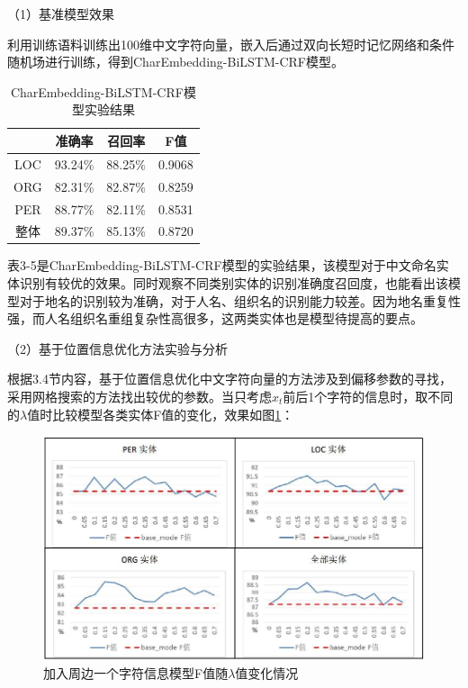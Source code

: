 \documentclass[winfonts,master,oneside,nobackinfo]{njuthesis}
\begin{document}
（1）基准模型效果

利用训练语料训练出100维中文字符向量，嵌入后通过双向长短时记忆网络和条件随机场进行训练，得到CharEmbedding-BiLSTM-CRF模型。

\begin{table}[H]
\centering
\begin{tabular}{|c|c|c|c|}
\hline
    & 准确率     & 召回率     & F值    \\ \hline
LOC & 93.24\% & 88.25\% & 0.9068 \\ \hline
ORG & 82.31\% & 82.87\% & 0.8259 \\ \hline
PER & 88.77\% & 82.11\% & 0.8531 \\ \hline
整体  & 89.37\% & 85.13\% & 0.8720 \\ \hline
\end{tabular}
\caption{CharEmbedding-BiLSTM-CRF模型实验结果}
\end{table}

表3-5是CharEmbedding-BiLSTM-CRF模型的实验结果，该模型对于中文命名实体识别有较优的效果。同时观察不同类别实体的识别准确度召回度，也能看出该模型对于地名的识别较为准确，对于人名、组织名的识别能力较差。因为地名重复性强，而人名组织名重组复杂性高很多，这两类实体也是模型待提高的要点。

（2）基于位置信息优化方法实验与分析

根据3.4节内容，基于位置信息优化中文字符向量的方法涉及到偏移参数的寻找，采用网格搜索的方法找出较优的参数。当只考虑$x_{t}$前后1个字符的信息时，取不同的$\lambda$值时比较模型各类实体F值的变化，效果如图\ref{k=1}：

\begin{figure}[H]
\centering
\includegraphics[width=1\textwidth]{./figure/参数1.jpg}
\caption{加入周边一个字符信息模型F值随$\lambda$值变化情况}
\label{k=1}
\end{figure}
\end{document}
